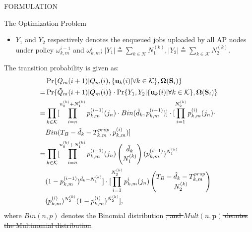 \documentclass[10pt, conference, letterpaper]{IEEEtran}
\newcommand{\define}{\triangleq}
\renewcommand{\vec}{\mathbf}
\DeclarePairedDelimiter{\set}{\{}{\}}
\newcommand{\apSet}{\mathcal{K}}
\newcommand{\Stat}{\mathbf{S}}
\newcommand{\Policy}{\mathbf{\Omega}}
\begin{document}
\begin{section}{FORMULATION}
\begin{subsection}{The Optimization Problem}
\begin{itemize}
                \item $Y_1$ and $Y_2$ respectively denotes the enqueued jobs uploaded by all AP nodes under policy $\omega_{k,m}^{i-1}$ and $\omega_{k,m}^{i}$; $|Y_1|\define\sum_{k\in\apSet}N^{(k)}_1, |Y_2|\define\sum_{k\in\apSet}N^{(k)}_2$.
            \end{itemize}
            The transition probability is given as:
            \begin{align}
                &\Pr\{Q_m(i+1)|Q_m(i), \set{\vec{u}_k(i)|\forall k\in\apSet}, \Policy(\Stat_i)\}
                \nonumber\\
                =& \Pr\{\tilde{Q}_m(i+1)|Q_m(i)\} \cdot \Pr\{Y_1, Y_2|\set{\vec{u}_k(i)|\forall k\in\apSet}, \Policy(\Stat_i)\}
                \nonumber\\
                =& \prod_{k\in\apSet} [\prod_{i=n}^{n^{(k)}_0 + N^{(k)}_1} p^{(i-1)}_{k,m}(j_n) \cdot Bin(\hat{d}_k, p^{(i-1)}_{k,m})] \cdot [\prod_{i=1}^{N^{(k)}_2} p^{(i)}_{k,m}(j_n) \cdot
                \nonumber\\
                &Bin(T_B-\hat{d}_k-T^{prop}_{k,m}, p^{(i)}_{k,m})]
                \nonumber\\
                =& \prod_{k\in\apSet} [\prod_{i=n}^{n^{(k)}_0 + N^{(k)}_1} p^{(i-1)}_{k,m}(j_n)
                    \begin{pmatrix}
                        \hat{d}_k \\ N^{(k)}_1
                    \end{pmatrix}
                    (p^{(i-1)}_{k,m})^{N^{(k)}_1}
                    \nonumber\\
                    &(1-p^{(i-1)}_{k,m})^{\hat{d}_k-N^{(k)}_1}] \cdot [\prod_{i=1}^{N^{(k)}_2} p^{i}_{k,m}(j_n)
                    \begin{pmatrix}
                        T_B-\hat{d}_k-T^{prop}_{k,m} \\ N^{(k)}_2
                    \end{pmatrix}
                    \nonumber\\
                    &(p^{(i)}_{k,m})^{N^{(k)}_2} (1-p^{(i)}_{k,m})^{\tilde{N}^{(k)}_2}],
            \end{align}
            where $Bin(n,p)$ denotes the Binomial distribution \st{, and $Mult(n, \vec{p})$ denotes the Multinomial distribution}.
        \end{subsection}
    \end{section}
\end{document}
